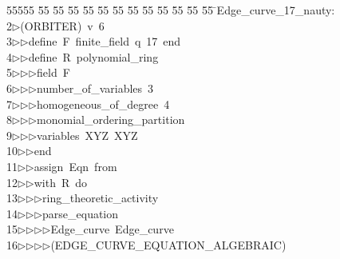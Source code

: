 %
%
\begin{tabbing}
55555 \= 55 \= 55 \= 55 \= 55 \= 55 \= 55 \= 55 \= 55 \= 55 \= 55 \= 55 \= 55 \= \>Edge\_curve\_17\_nauty:\\[0pt]
2\>$\triangleright$\>(ORBITER)\ v\ 6\ \\[0pt]
3\>$\triangleright$\>$\triangleright$\>define\ F\ finite\_field\ q\ 17\ end\ \\[0pt]
4\>$\triangleright$\>$\triangleright$\>define\ R\ polynomial\_ring\ \\[0pt]
5\>$\triangleright$\>$\triangleright$\>$\triangleright$\>field\ F\ \\[0pt]
6\>$\triangleright$\>$\triangleright$\>$\triangleright$\>number\_of\_variables\ 3\ \\[0pt]
7\>$\triangleright$\>$\triangleright$\>$\triangleright$\>homogeneous\_of\_degree\ 4\ \\[0pt]
8\>$\triangleright$\>$\triangleright$\>$\triangleright$\>monomial\_ordering\_partition\ \\[0pt]
9\>$\triangleright$\>$\triangleright$\>$\triangleright$\>variables\ XYZ\ XYZ\ \\[0pt]
10\>$\triangleright$\>$\triangleright$\>end\ \\[0pt]
11\>$\triangleright$\>$\triangleright$\>assign\ Eqn\ from\ \\[0pt]
12\>$\triangleright$\>$\triangleright$\>with\ R\ do\ \\[0pt]
13\>$\triangleright$\>$\triangleright$\>$\triangleright$\>ring\_theoretic\_activity\ \\[0pt]
14\>$\triangleright$\>$\triangleright$\>$\triangleright$\>parse\_equation\ \\[0pt]
15\>$\triangleright$\>$\triangleright$\>$\triangleright$\>$\triangleright$\>Edge\_curve\ Edge\_curve\ \\[0pt]
16\>$\triangleright$\>$\triangleright$\>$\triangleright$\>$\triangleright$\>(EDGE\_CURVE\_EQUATION\_ALGEBRAIC)\ \\[0pt]

\end{tabbing}
